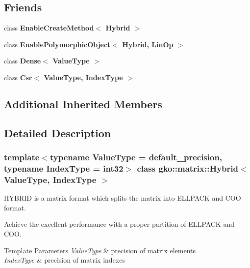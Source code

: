 \subsection*{Friends}
\begin{DoxyCompactItemize}
\item 
\mbox{\label{classgko_1_1matrix_1_1Hybrid_a6e007d7f34688b24757931d9b29b553d}} 
class {\bfseries Enable\+Create\+Method$<$ Hybrid $>$}
\item 
\mbox{\label{classgko_1_1matrix_1_1Hybrid_a5daaa720a8e5d05fd99206759d6e3649}} 
class {\bfseries Enable\+Polymorphic\+Object$<$ Hybrid, Lin\+Op $>$}
\item 
\mbox{\label{classgko_1_1matrix_1_1Hybrid_a22a84c8f67f946aa60a2fa8bf5835a32}} 
class {\bfseries Dense$<$ Value\+Type $>$}
\item 
\mbox{\label{classgko_1_1matrix_1_1Hybrid_a3962faf971a3df6ff4c9226c61fb24cc}} 
class {\bfseries Csr$<$ Value\+Type, Index\+Type $>$}
\end{DoxyCompactItemize}
\subsection*{Additional Inherited Members}


\subsection{Detailed Description}
\subsubsection*{template$<$typename Value\+Type = default\+\_\+precision, typename Index\+Type = int32$>$\newline
class gko\+::matrix\+::\+Hybrid$<$ Value\+Type, Index\+Type $>$}

H\+Y\+B\+R\+ID is a matrix format which splits the matrix into E\+L\+L\+P\+A\+CK and C\+OO format. 

Achieve the excellent performance with a proper partition of E\+L\+L\+P\+A\+CK and C\+OO.


\begin{DoxyTemplParams}{Template Parameters}
{\em Value\+Type} & precision of matrix elements \\
\hline
{\em Index\+Type} & precision of matrix indexes \\
\hline
\end{DoxyTemplParams}


